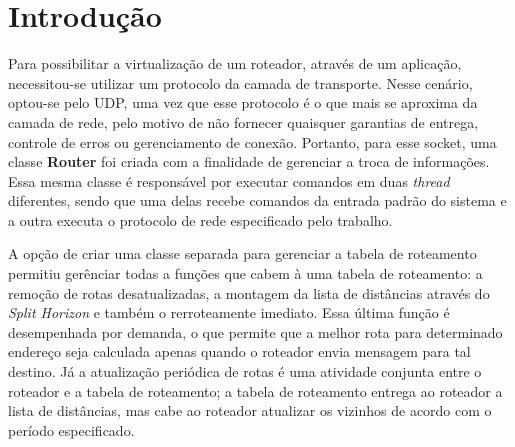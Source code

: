 \section{Introdução}

Para possibilitar a virtualização de um roteador, através de um aplicação,
necessitou-se utilizar um protocolo da camada de transporte.
Nesse cenário, optou-se pelo UDP, uma vez que esse protocolo é o que mais se
aproxima da camada de rede, pelo motivo de não fornecer quaisquer garantias
de entrega, controle de erros ou gerenciamento de conexão.
Portanto, para esse socket, uma classe \textbf{Router} foi criada com a
finalidade de gerenciar a troca de informações.
Essa mesma classe é responsável por executar comandos em duas \textit{thread}
diferentes, sendo que uma delas recebe comandos da entrada padrão do sistema e 
a outra executa o protocolo de rede especificado pelo trabalho.

A opção de criar uma classe separada para gerenciar a tabela de roteamento
permitiu gerênciar todas a funções que cabem à uma tabela de roteamento: a
remoção de rotas desatualizadas, a montagem da lista de distâncias através
do \textit{Split Horizon} e também o rerroteamente imediato. Essa última função
é desempenhada por demanda, o que permite que a melhor rota para determinado
endereço seja calculada apenas quando o roteador envia mensagem para tal
destino. Já a atualização periódica de rotas é uma atividade conjunta entre o
roteador e a tabela de roteamento; a tabela de roteamento entrega ao roteador
a lista de distâncias, mas cabe ao roteador atualizar os vizinhos de acordo com
o período especificado.